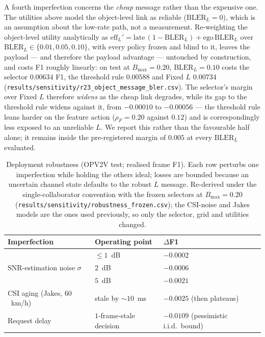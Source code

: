 \documentclass[journal]{IEEEtran}
\begin{document}
A fourth imperfection concerns the \emph{cheap} message rather than the expensive one. The
utilities above model the object-level link as reliable ($\mathrm{BLER}_L=0$), which is an assumption
about the low-rate path, not a measurement. Re-weighting the object-level utility analytically as
$\mathrm{eff}_L'=\mathrm{late}\,(1-\mathrm{BLER}_L)+\mathrm{ego}\,\mathrm{BLER}_L$ over
$\mathrm{BLER}_L\in\{0.01,0.05,0.10\}$, with every policy frozen and blind to it, leaves the payload
--- and therefore the payload advantage --- untouched by construction, and costs F1 roughly linearly:
on test at $B_{\max}=0.20$, $\mathrm{BLER}_L=0.10$ costs the selector $0.00634$ F1, the threshold rule
$0.00588$ and Fixed $L$ $0.00734$
(\texttt{results/sensitivity/r23\_object\_message\_bler.csv}). The selector's margin over Fixed $L$
therefore \emph{widens} as the cheap link degrades, while its gap to the threshold rule widens
against it, from $-0.00010$ to $-0.00056$ --- the threshold rule leans harder on the feature action
($\rho_F=0.20$ against $0.12$) and is correspondingly less exposed to an unreliable $L$. We report
this rather than the favourable half alone; it remains inside the pre-registered margin of $0.005$ at
every $\mathrm{BLER}_L$ evaluated.

\begin{table}[t]
\centering
\footnotesize
\setlength{\tabcolsep}{3pt}
\caption{Deployment robustness (OPV2V test; realised frame F1). Each row perturbs one
imperfection while holding the others ideal; losses are bounded because an uncertain channel
state defaults to the robust $L$ message. Re-derived under the single-collaborator convention with
the frozen selectors at $B_{\max}=0.20$ (\texttt{results/sensitivity/robustness\_frozen.csv}); the
CSI-noise and Jakes models are the ones used previously, so only the selector, grid and utilities
changed.}
\label{tab:robustness}
\begin{tabular}{lll}
\toprule
Imperfection & Operating point & $\Delta$F1 \\
\midrule
\multirow{3}{*}{SNR-estimation noise $\sigma$}
   & $\le 1$~dB              & $-0.0002$ \\
   & $2$~dB                  & $-0.0006$ \\
   & $5$~dB                  & $-0.0021$ \\
\midrule
CSI aging (Jakes, $60$~km/h) & stale by ${\sim}10$~ms & $-0.0025$ (then plateaus) \\
\midrule
Request delay & $1$-frame-stale decision & $-0.0109$ (pessimistic i.i.d.\ bound) \\
\bottomrule
\end{tabular}
\end{table}
\end{document}
